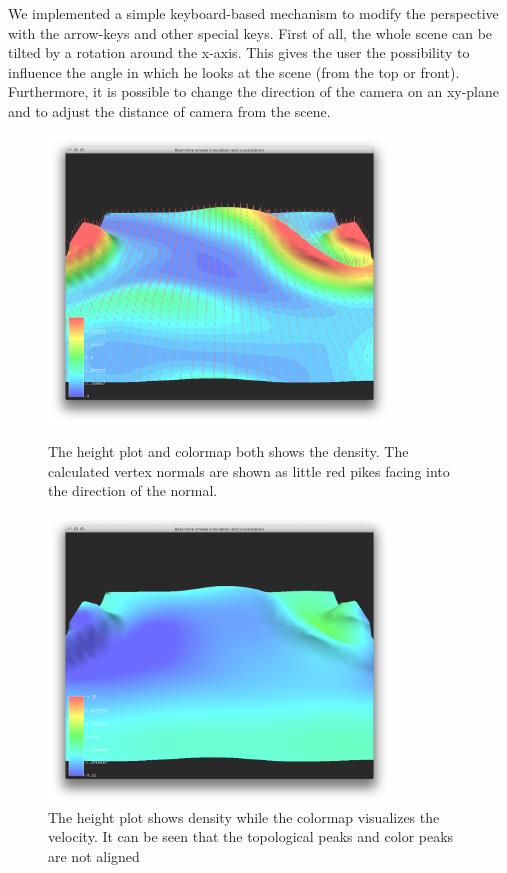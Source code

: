 We implemented a simple keyboard-based mechanism to modify the perspective with the arrow-keys and other special keys. First of all, the whole scene can be tilted by a rotation around the x-axis. This gives the user the possibility to influence the angle in which he looks at the scene (from the top or front). Furthermore, it is possible to change the direction of the camera on an xy-plane and to adjust the distance of  camera  from the scene. 


\begin{figure}[htbp]
\centering
\begin{minipage}[t]{0.48\textwidth}
        \includegraphics[height=3in]{figures/heightplot/densitynormals.png}
        \caption{The height plot and colormap both shows the density. The calculated vertex normals are shown as little red pikes facing into the direction of the normal.}
\label{fig:heighplot_densityNormals}
\end{minipage}\hspace{.04\textwidth}%
\begin{minipage}[t]{0.48\textwidth}
 \includegraphics[height=3in]{figures/heightplot/densityvelocity.png}
    \caption{The height plot shows density while the colormap visualizes the velocity. It can be seen that the topological peaks and color peaks are not aligned }
    \label{fig:heighplot_densityVelocity}
\end{minipage}
\end{figure}


